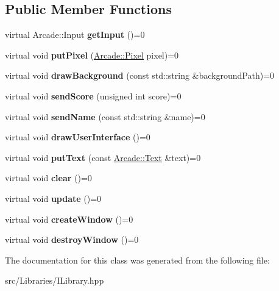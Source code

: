 \subsection*{Public Member Functions}
\begin{DoxyCompactItemize}
\item 
\mbox{\label{class_arcade_1_1_i_library_a2692a472028ff773b1f5613abf5932f8}} 
virtual Arcade\+::\+Input {\bfseries get\+Input} ()=0
\item 
\mbox{\label{class_arcade_1_1_i_library_afbc8a084721cd0d0beaa9dbfb8df4c36}} 
virtual void {\bfseries put\+Pixel} (\mbox{\hyperlink{struct_arcade_1_1_pixel}{Arcade\+::\+Pixel}} pixel)=0
\item 
\mbox{\label{class_arcade_1_1_i_library_aa0e372ca4c265215eb52479eafb4ccbf}} 
virtual void {\bfseries draw\+Background} (const std\+::string \&background\+Path)=0
\item 
\mbox{\label{class_arcade_1_1_i_library_a4c840ecfc867bd7bc6d99a6dc7f08adb}} 
virtual void {\bfseries send\+Score} (unsigned int score)=0
\item 
\mbox{\label{class_arcade_1_1_i_library_ad71f48b3f2384639b96d8ad1170b19fa}} 
virtual void {\bfseries send\+Name} (const std\+::string \&name)=0
\item 
\mbox{\label{class_arcade_1_1_i_library_ab93f08e87209f22fb9517f82a040d01a}} 
virtual void {\bfseries draw\+User\+Interface} ()=0
\item 
\mbox{\label{class_arcade_1_1_i_library_adfce11518f2243b5414853a9c43bd0ed}} 
virtual void {\bfseries put\+Text} (const \mbox{\hyperlink{struct_arcade_1_1_text}{Arcade\+::\+Text}} \&text)=0
\item 
\mbox{\label{class_arcade_1_1_i_library_aec6d25695326978633b64df2748221ba}} 
virtual void {\bfseries clear} ()=0
\item 
\mbox{\label{class_arcade_1_1_i_library_a165b072a1e4c29b70954f3236d418426}} 
virtual void {\bfseries update} ()=0
\item 
\mbox{\label{class_arcade_1_1_i_library_a9841d65f5411d231971ead51575ac81c}} 
virtual void {\bfseries create\+Window} ()=0
\item 
\mbox{\label{class_arcade_1_1_i_library_af6d9d01fea85b8dae789836ad20d2388}} 
virtual void {\bfseries destroy\+Window} ()=0
\end{DoxyCompactItemize}


The documentation for this class was generated from the following file\+:\begin{DoxyCompactItemize}
\item 
src/\+Libraries/I\+Library.\+hpp\end{DoxyCompactItemize}
